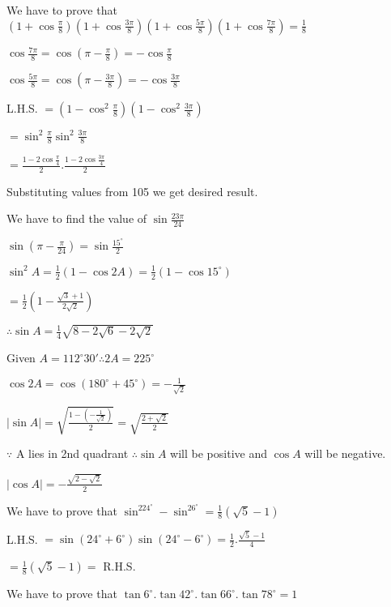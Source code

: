 \item We have to prove that $\left(1 + \cos \frac{\pi}{8}\right)\left(1 + \cos\frac{3\pi}{8}\right)\left(1 +
  \cos\frac{5\pi}{8}\right)\left(1 + \cos \frac{7\pi}{8}\right) = \frac{1}{8}$

  $\cos\frac{7\pi}{8} = \cos\left(\pi - \frac{\pi}{8}\right) = -\cos\frac{\pi}{8}$

  $\cos\frac{5\pi}{8} = \cos\left(\pi - \frac{3\pi}{8}\right) = -\cos\frac{3\pi}{8}$

  L.H.S. $= \left(1 - \cos^2\frac{\pi}{8}\right)\left(1 - \cos^2\frac{3\pi}{8}\right)$

  $= \sin^2\frac{\pi}{8}\sin^2\frac{3\pi}{8}$

  $= \frac{1 - 2\cos\frac{\pi}{4}}{2}.\frac{1 - 2\cos\frac{3\pi}{4}}{2}$

  Substituting values from 105 we get desired result.

\item We have to find the value of $\sin \frac{23\pi}{24}$

  $\sin \left(\pi - \frac{\pi}{24}\right) = \sin\frac{15^\circ}{2}$

  $\sin^2A = \frac{1}{2}(1 - \cos 2A) = \frac{1}{2}(1 - \cos15^\circ)$

  $= \frac{1}{2}\left(1 - \frac{\sqrt{3} + 1}{2\sqrt{2}}\right)$

  $\therefore \sin A = \frac{1}{4}\sqrt{8 - 2\sqrt{6} - 2\sqrt{2}}$

\item Given $A = 112^\circ30'\therefore 2A = 225^\circ$

  $\cos 2A = \cos(180^\circ + 45^\circ) = -\frac{1}{\sqrt{2}}$

  $|\sin A| = \sqrt{\frac{1 - \left(-\frac{1}{\sqrt{2}}\right)}{2}} = \sqrt{\frac{2 + \sqrt{2}}{2}}$

  $\because$ A lies in 2nd quadrant $\therefore \sin A$ will be positive and $\cos A$ will be negative.

  $|\cos A| = -\frac{\sqrt{2 - \sqrt{2}}}{2}$

\item We have to prove that $\sin^224^\circ - \sin^26^\circ = \frac{1}{8}(\sqrt{5} - 1)$

  L.H.S. $= \sin(24^\circ + 6^\circ)\sin(24^\circ - 6^\circ) = \frac{1}{2}.\frac{\sqrt{5} - 1}{4}$

  $= \frac{1}{8}(\sqrt{5} - 1) =$ R.H.S.

\item We have to prove that $\tan6^\circ.\tan42^\circ.\tan66^\circ.\tan78^\circ = 1$

